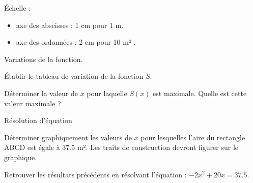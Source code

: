 \documentclass[a4paper,12pt]{scrartcl}
\begin{document}
Échelle :

\begin{itemize}
\item axe des abscisses : 1 cm pour 1 m.
\item axe des ordonnées : 2 cm pour 10 m² .
\end{itemize}

\question{}
Variations de la fonction.

\subquestion{}
Établir le tableau de variation de la fonction $S$.

\subquestion{}
Déterminer la valeur de $x$ pour laquelle $S(x)$ est maximale. Quelle est cette valeur maximale ?

\question{}
Résolution d'équation

\subquestion{}
Déterminer graphiquement les valeurs de $x$ pour lesquelles l’aire du rectangle
ABCD est égale à 37.5 m². Les traits de construction devront figurer sur le
graphique.

\subquestion{}
Retrouver les résultats précédents en résolvant l’équation : $-2x^2 + 20x = 37.5$.

%
%
%
%
%
%
%
%
%
%
\end{document}
